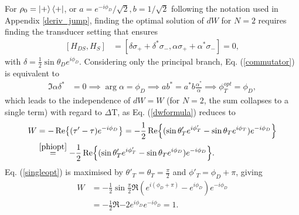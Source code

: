 For $\rho_0 = \ket{+} \bra{+}$, or $a = e^{-i \phi_D}/\sqrt{2}, b = 1/\sqrt{2}$ following the notation used in Appendix \ref{deriv_jump}, finding the optimal solution of $dW$ for $N = 2$ requires finding the transducer setting that ensures
\begin{align}\label{commutator}
	[H_{DS}, H_S] &= [\delta \sigma_{+} + \delta^* \sigma_{-}, \alpha \sigma_{+} + \alpha^* \sigma_{-}] = 0,
\end{align}
with $\delta = \frac{1}{2} \sin{\theta_D} e^{i \phi_D}$.
Considering only the principal branch, Eq. (\ref{commutator}) is equivalent to
\begin{align}
	\Im{\alpha \delta^*} &= 0 \implies \arg{\alpha} = \phi_D \implies a b^* = a^* b \frac{\alpha^*}{\alpha} \implies \phi_T^{opt} = \phi_D, \label{phiopt}
\end{align}
which leads to the independence of $dW = W$ (for $N=2$, the sum collapses to a single term) with regard to $\Delta \mathrm{T}$, as Eq. (\ref{dwformula}) reduces to
\begin{align}
	W &= - \Re{(\tau' - \tau) e^{-i\phi_D}} = - \frac{1}{2} \Re{(\sin \theta'_T e^{i\phi'_T} - \sin \theta_T e^{i\phi_T}) e^{-i\phi_D}} \\
	&\overset{\ref{phiopt}}{=} - \frac{1}{2} \Re{(\sin \theta'_T e^{i\phi'_T} - \sin \theta_T e^{i\phi_D}) e^{-i\phi_D}}. \label{singleopt}
\end{align}
Eq. (\ref{singleopt}) is maximised by $\theta'_T = \theta_T = \frac{\pi}{2}$ and $\phi'_T = \phi_D + \pi$, giving
\begin{align}
	W &= - \frac{1}{2} \sin \frac{\pi}{2} \Re{(e^{i(\phi_D + \pi)} - e^{i\phi_D}) e^{-i\phi_D}} \nonumber \\
	&= - \frac{1}{2} \Re{ -2 e^{i\phi_D} e^{-i\phi_D}} = 1.
\end{align}
